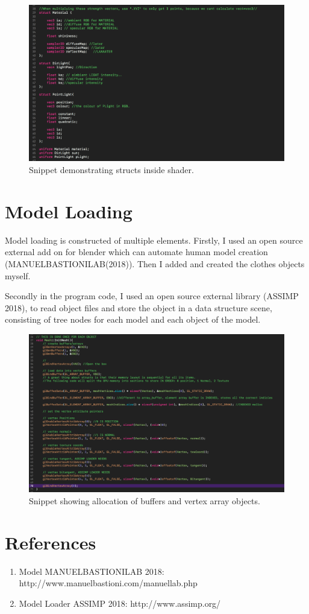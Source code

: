 \documentclass[a4paper,11pt]{article}
\begin{document}
	
\begin{figure}
\includegraphics[scale=0.5]{struct.png}
\caption{Snippet demonstrating structs inside shader.}
\label{struct}
\end{figure}
\clearpage
\newpage

	\section{Model Loading}
	
	Model loading is constructed of multiple elements. Firstly, I used an open source external add on for blender which can automate human model creation (MANUELBASTIONILAB(2018)). Then I added and created the clothes objects myself.
	 
	 Secondly in the program code, I used an open source external library (ASSIMP 2018), to read object files and store the object in a data structure scene, consisting of tree nodes for each model and each object of the model.

\begin{figure}
\centering
\includegraphics[scale=0.5]{VAO.png}
\caption{Snippet showing allocation of buffers and vertex array objects.}
\label{VAO}
\end{figure}


\section{References}

	\begin{enumerate}
		
		\item Model MANUELBASTIONILAB 2018:  http://www.manuelbastioni.com/manuellab.php
		
		\item Model Loader ASSIMP 2018: http://www.assimp.org/
							
		\end{enumerate}
\end{document}
